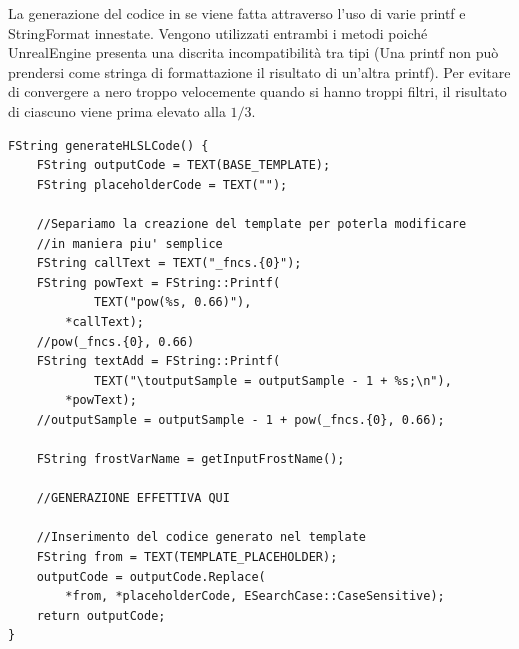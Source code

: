 \documentclass[main.tex]{subfiles}
\begin{document}
La generazione del codice in se viene fatta attraverso l'uso di varie printf e StringFormat innestate. Vengono utilizzati entrambi i metodi poiché UnrealEngine presenta una discrita incompatibilità tra tipi (Una printf non può prendersi come stringa di formattazione il risultato di un'altra printf). Per evitare di convergere a nero troppo velocemente quando si hanno troppi filtri, il risultato di ciascuno viene prima elevato alla $1/3$.
\clearpage %
\lstset{language=UEcpp}
\begin{lstlisting}
FString generateHLSLCode() {
    FString outputCode = TEXT(BASE_TEMPLATE);
    FString placeholderCode = TEXT("");

    //Separiamo la creazione del template per poterla modificare
    //in maniera piu' semplice
    FString callText = TEXT("_fncs.{0}");
    FString powText = FString::Printf(
            TEXT("pow(%s, 0.66)"),
        *callText);
    //pow(_fncs.{0}, 0.66)
    FString textAdd = FString::Printf(
            TEXT("\toutputSample = outputSample - 1 + %s;\n"),
        *powText);
    //outputSample = outputSample - 1 + pow(_fncs.{0}, 0.66);
    
    FString frostVarName = getInputFrostName();

    //GENERAZIONE EFFETTIVA QUI

    //Inserimento del codice generato nel template
    FString from = TEXT(TEMPLATE_PLACEHOLDER);
	outputCode = outputCode.Replace(
        *from, *placeholderCode, ESearchCase::CaseSensitive);
	return outputCode;
}
\end{lstlisting}
\end{document}
